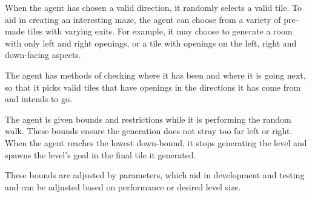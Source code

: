 \documentclass[progress]{cmpreport}
\begin{document}
When the agent has chosen a valid direction, it randomly selects a valid tile. To aid in creating an interesting maze, the agent can choose from a variety of pre-made tiles with varying exits. For example, it may choose to generate a room with only left and right openings, or a tile with openings on the left, right and down-facing aspects. 

The agent has methods of checking where it has been and where it is going next, so that it picks valid tiles that have openings in the directions it has come from and intends to go.

The agent is given bounds and restrictions while it is performing the random walk. These bounds ensure the generation does not stray too far left or right. When the agent reaches the lowest down-bound, it stops generating the level and spawns the level's goal in the final tile it generated.

These bounds are adjusted by parameters, which aid in development and testing and can be adjusted based on performance or desired level size.
\end{document}
